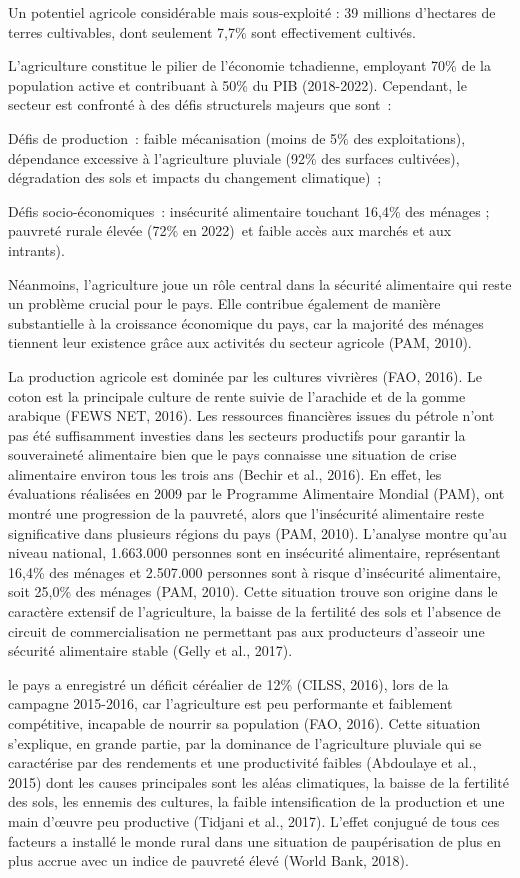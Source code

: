 \documentclass[12pt,oneside]{report}
\begin{document}
Un potentiel agricole considérable mais sous-exploité : 39 millions d'hectares de terres cultivables, dont seulement 7,7\% sont effectivement cultivés.

L'agriculture constitue le pilier de l'économie tchadienne, employant 70\% de la population active et contribuant à 50\% du PIB (2018-2022). Cependant, le secteur est confronté à des défis structurels majeurs que sont :

Défis de production : faible mécanisation (moins de 5\% des exploitations), dépendance excessive à l'agriculture pluviale (92\% des surfaces cultivées), dégradation des sols et impacts du changement climatique) ;

Défis socio-économiques : insécurité alimentaire touchant 16,4\% des ménages ; pauvreté rurale élevée (72\% en 2022) et faible accès aux marchés et aux intrants).

Néanmoins, l’agriculture joue un rôle central dans la sécurité alimentaire qui reste un problème crucial pour le pays. Elle contribue également de manière substantielle à la croissance économique du pays, car la majorité des ménages tiennent leur existence grâce aux activités du secteur agricole (PAM, 2010).

La production agricole est dominée par les cultures vivrières (FAO, 2016). Le coton est la principale culture de rente suivie de l'arachide et de la gomme arabique (FEWS NET, 2016).  Les ressources financières issues du pétrole n'ont pas été suffisamment investies dans les secteurs productifs pour garantir la souveraineté alimentaire bien que le pays connaisse une situation de crise alimentaire environ tous les trois ans (Bechir et al., 2016). En effet, les évaluations réalisées en 2009 par le Programme Alimentaire Mondial (PAM), ont montré une progression de la pauvreté, alors que l’insécurité alimentaire reste significative dans plusieurs régions du pays (PAM, 2010). L’analyse montre qu’au niveau national, 1.663.000 personnes sont en insécurité alimentaire, représentant 16,4\% des ménages et 2.507.000 personnes sont à risque d’insécurité alimentaire, soit 25,0\% des ménages (PAM, 2010). Cette situation trouve son origine dans le caractère extensif de l’agriculture, la baisse de la fertilité des sols et l’absence de circuit de commercialisation ne permettant pas aux producteurs d’asseoir une sécurité alimentaire stable (Gelly et al., 2017).

le pays a enregistré un déficit céréalier de 12\% (CILSS, 2016), lors de la campagne 2015-2016, car l’agriculture est peu performante et faiblement compétitive, incapable de nourrir sa population (FAO, 2016). Cette situation s’explique, en grande partie, par la dominance de l'agriculture pluviale qui se caractérise par des rendements et une productivité faibles (Abdoulaye et al., 2015) dont les causes principales sont les aléas climatiques, la baisse de la fertilité des sols, les ennemis des cultures, la faible intensification de la production et une main d'œuvre peu productive (Tidjani et al., 2017). L'effet conjugué de tous ces facteurs a installé le monde rural dans une situation de paupérisation de plus en plus accrue avec un indice de pauvreté élevé (World Bank, 2018).
\end{document}
